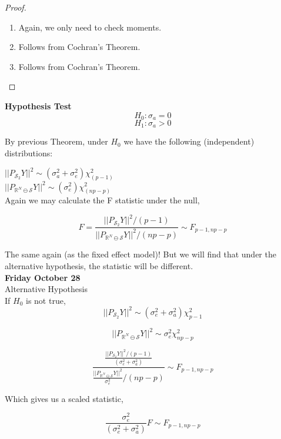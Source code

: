 \documentclass[11pt,fleqn]{book} %
\begin{document}
\begin{proof}
\begin{enumerate}
	\item Again, we only need to check moments. 
	\item Follows from Cochran's Theorem.
	\item Follows from Cochran's Theorem.
	\end{enumerate}
\end{proof}


\textbf{Hypothesis Test}\\

		$$H_0: \sigma_a = 0 $$
		$$H_1: \sigma_a > 0 $$

By previous Theorem, under $H_0$ we have the following (independent) distributions:

 $|| P_{\mathcal{S}_2} Y||^2 \sim (\sigma^2_a + \sigma^2_e) \chi^2_{(p-1)}  $\\

 $|| P_{\mathbb{R}^N \ominus \mathcal{S}} Y||^2 \sim (\sigma^2_e) \chi^2_{(np-p)}  $\\

 Again we may calculate the F statistic under the null, 


 		$$F = \frac{|| P_{\mathcal{S}_2} Y||^2/(p-1)}{|| P_{\mathbb{R}^N \ominus \mathcal{S}} Y||^2 / (np - p)} \sim F_{p-1, np - p} $$


The same again (as the fixed effect model)! But we will find that under the alternative hypothesis, the statistic will be different.\\


\textbf{Friday October 28}\\



Alternative Hypothesis\\



If $H_0$ is not true, \\

		$$ || P_{\mathcal{S}_2} Y||^2 \sim (\sigma_e^2 + \sigma_a^2) \chi^2 _{p-1}$$

		$$|| P_{\mathbb{R}^N \ominus \mathcal{S}} Y||^2 \sim \sigma_e^2 \chi^2_{np - p} $$



			$$ \frac{\frac{|| P_{\mathcal{S}_2} Y||^2/(p-1)}{(\sigma_e^2 + \sigma_a^2)}}{\frac{|| P_{\mathbb{R}^N \ominus \mathcal{S}} Y||^2}{\sigma_e^2 } / (np - p)} \sim F_{p-1, np - p} $$

Which gives us a scaled statistic, 


		$$\frac{\sigma^2_e}{(\sigma_e^2 + \sigma_a^2)} F \sim  F_{p-1, np - p} $$
\end{document}
